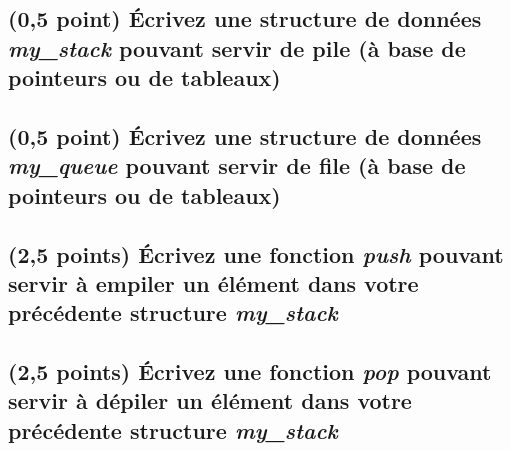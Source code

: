 \documentclass[11pt,a4paper]{article}
\begin{document}
\clearpage


\subsection{(0,5 point) \'Ecrivez une structure de données \og \textit{my\_stack} \fg{} pouvant servir de pile (à base de pointeurs ou de tableaux) }

\bigskip

\begin{center}
\end{center}

\bigskip


\subsection{(0,5 point) \'Ecrivez une structure de données \og \textit{my\_queue} \fg{} pouvant servir de file (à base de pointeurs ou de tableaux) }

\bigskip

\begin{center}
\end{center}


\clearpage


\subsection{(2,5 points) \'Ecrivez une fonction \og \textit{push} \fg{} pouvant servir à empiler un élément dans votre précédente structure \og \textit{my\_stack} \fg{} }

\bigskip

\begin{center}

\end{center}


\newpage


\subsection{(2,5 points) \'Ecrivez une fonction \og \textit{pop} \fg{} pouvant servir à dépiler un élément dans votre précédente structure \og \textit{my\_stack} \fg{} }
\end{document}
